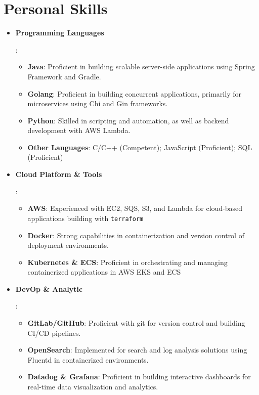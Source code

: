 \documentclass[letterpaper,11pt]{article}
\newcommand{\resumeItem}[2]{
  \item\small{
    \textbf{#1}{: #2 \vspace{-2pt}}
  }
}
\newcommand{\resumeSubItem}[2]{
  \item\small{
    \textbf{#1}{: #2 \vspace{-2pt}}
  }
}
\newcommand{\resumeItemListStart}{\begin{itemize}[leftmargin=*]}
\newcommand{\resumeItemListEnd}{\end{itemize}\vspace{-5pt}}
\newcommand{\resumeSubItemListStart}{\begin{itemize}[leftmargin=*]\vspace{-5pt}}
\newcommand{\resumeSubItemListEnd}{\end{itemize}\vspace{-5pt}}
\begin{document}
\section{Personal Skills}
    \resumeItemListStart
        \resumeItem{Programming Languages}{
          \resumeSubItemListStart
            \resumeSubItem{Java}{Proficient in building scalable server-side applications using Spring Framework and Gradle.}
            \resumeSubItem{Golang}{Proficient in building concurrent applications, primarily for microservices using Chi and Gin frameworks.}
            \resumeSubItem{Python}{Skilled in scripting and automation, as well as backend development with AWS Lambda.}
            \resumeSubItem{Other Languages}{C/C++ (Competent); JavaScript (Proficient); SQL (Proficient)}
          \resumeSubItemListEnd
        }
        \resumeItem{Cloud Platform \& Tools}{
          \resumeSubItemListStart
            \resumeSubItem{AWS}{Experienced with EC2, SQS, S3, and Lambda for cloud-based applications building with \texttt{terraform}}
            \resumeSubItem{Docker}{Strong capabilities in containerization and version control of deployment environments.}
            \resumeSubItem{Kubernetes \& ECS}{Proficient in orchestrating and managing containerized applications in AWS EKS and ECS}
          \resumeSubItemListEnd
        }
        \resumeItem{DevOp \& Analytic}{
          \resumeSubItemListStart
            \resumeSubItem{GitLab/GitHub}{Proficient with git for version control and building CI/CD pipelines.}
            \resumeSubItem{OpenSearch}{Implemented for search and log analysis solutions using Fluentd in containerized environments.}
            \resumeSubItem{Datadog \& Grafana}{Proficient in building interactive dashboards for real-time data visualization and analytics.}
          \resumeSubItemListEnd
        }
    \resumeItemListEnd
    
\end{document}
